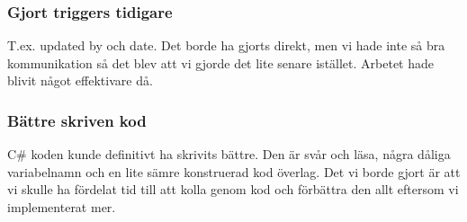 \documentclass[11pt]{article}					%
\begin{document}
\subsubsection*{Gjort triggers tidigare}
T.ex. updated by och date. Det borde ha gjorts direkt, men vi hade inte så bra kommunikation så det blev att vi gjorde det lite senare istället. Arbetet hade blivit något effektivare då.
\subsubsection*{Bättre skriven kod}
C\# koden kunde definitivt ha skrivits bättre. Den är svår och läsa, några dåliga variabelnamn och en lite sämre konstruerad kod överlag. Det vi borde gjort är att vi skulle ha fördelat tid till att kolla genom kod och förbättra den allt eftersom vi implementerat mer.
\end{document}
